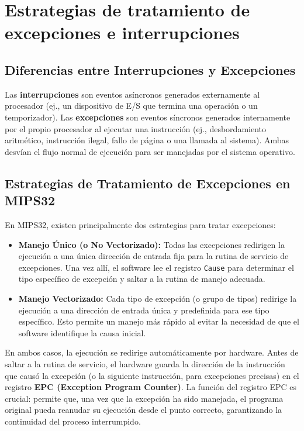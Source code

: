 \documentclass[12pt,a4paper]{article}
\begin{document}
	
	\section{Estrategias de tratamiento de excepciones e interrupciones}
	
	\subsection{Diferencias entre Interrupciones y Excepciones}
	Las \textbf{interrupciones} son eventos asíncronos generados externamente al procesador (ej., un dispositivo de E/S que termina una operación o un temporizador). Las \textbf{excepciones} son eventos síncronos generados internamente por el propio procesador al ejecutar una instrucción (ej., desbordamiento aritmético, instrucción ilegal, fallo de página o una llamada al sistema). Ambas desvían el flujo normal de ejecución para ser manejadas por el sistema operativo.
	
	\subsection{Estrategias de Tratamiento de Excepciones en MIPS32}
	En MIPS32, existen principalmente dos estrategias para tratar excepciones:
	\begin{itemize}
		\item \textbf{Manejo Único (o No Vectorizado):} Todas las excepciones redirigen la ejecución a una única dirección de entrada fija para la rutina de servicio de excepciones. Una vez allí, el software lee el registro \texttt{Cause} para determinar el tipo específico de excepción y saltar a la rutina de manejo adecuada.
		\item \textbf{Manejo Vectorizado:} Cada tipo de excepción (o grupo de tipos) redirige la ejecución a una dirección de entrada única y predefinida para ese tipo específico. Esto permite un manejo más rápido al evitar la necesidad de que el software identifique la causa inicial.
	\end{itemize}
	En ambos casos, la ejecución se redirige automáticamente por hardware. Antes de saltar a la rutina de servicio, el hardware guarda la dirección de la instrucción que causó la excepción (o la siguiente instrucción, para excepciones precisas) en el registro \textbf{EPC (Exception Program Counter)}. La función del registro EPC es crucial: permite que, una vez que la excepción ha sido manejada, el programa original pueda reanudar su ejecución desde el punto correcto, garantizando la continuidad del proceso interrumpido.
	
\end{document}
